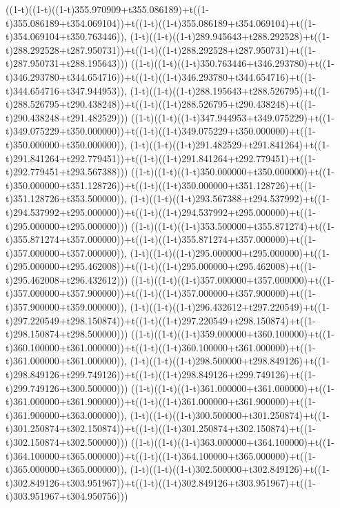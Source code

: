 ((1-t)((1-t)((1-t)355.970909+t355.086189)+t((1-t)355.086189+t354.069104))+t((1-t)((1-t)355.086189+t354.069104)+t((1-t)354.069104+t350.763446)),                                     (1-t)((1-t)((1-t)289.945643+t288.292528)+t((1-t)288.292528+t287.950731))+t((1-t)((1-t)288.292528+t287.950731)+t((1-t)287.950731+t288.195643)))
((1-t)((1-t)((1-t)350.763446+t346.293780)+t((1-t)346.293780+t344.654716))+t((1-t)((1-t)346.293780+t344.654716)+t((1-t)344.654716+t347.944953)),                                     (1-t)((1-t)((1-t)288.195643+t288.526795)+t((1-t)288.526795+t290.438248))+t((1-t)((1-t)288.526795+t290.438248)+t((1-t)290.438248+t291.482529)))
((1-t)((1-t)((1-t)347.944953+t349.075229)+t((1-t)349.075229+t350.000000))+t((1-t)((1-t)349.075229+t350.000000)+t((1-t)350.000000+t350.000000)),                                     (1-t)((1-t)((1-t)291.482529+t291.841264)+t((1-t)291.841264+t292.779451))+t((1-t)((1-t)291.841264+t292.779451)+t((1-t)292.779451+t293.567388)))
((1-t)((1-t)((1-t)350.000000+t350.000000)+t((1-t)350.000000+t351.128726))+t((1-t)((1-t)350.000000+t351.128726)+t((1-t)351.128726+t353.500000)),                                     (1-t)((1-t)((1-t)293.567388+t294.537992)+t((1-t)294.537992+t295.000000))+t((1-t)((1-t)294.537992+t295.000000)+t((1-t)295.000000+t295.000000)))
((1-t)((1-t)((1-t)353.500000+t355.871274)+t((1-t)355.871274+t357.000000))+t((1-t)((1-t)355.871274+t357.000000)+t((1-t)357.000000+t357.000000)),                                     (1-t)((1-t)((1-t)295.000000+t295.000000)+t((1-t)295.000000+t295.462008))+t((1-t)((1-t)295.000000+t295.462008)+t((1-t)295.462008+t296.432612)))
((1-t)((1-t)((1-t)357.000000+t357.000000)+t((1-t)357.000000+t357.900000))+t((1-t)((1-t)357.000000+t357.900000)+t((1-t)357.900000+t359.000000)),                                     (1-t)((1-t)((1-t)296.432612+t297.220549)+t((1-t)297.220549+t298.150874))+t((1-t)((1-t)297.220549+t298.150874)+t((1-t)298.150874+t298.500000)))
((1-t)((1-t)((1-t)359.000000+t360.100000)+t((1-t)360.100000+t361.000000))+t((1-t)((1-t)360.100000+t361.000000)+t((1-t)361.000000+t361.000000)),                                     (1-t)((1-t)((1-t)298.500000+t298.849126)+t((1-t)298.849126+t299.749126))+t((1-t)((1-t)298.849126+t299.749126)+t((1-t)299.749126+t300.500000)))
((1-t)((1-t)((1-t)361.000000+t361.000000)+t((1-t)361.000000+t361.900000))+t((1-t)((1-t)361.000000+t361.900000)+t((1-t)361.900000+t363.000000)),                                     (1-t)((1-t)((1-t)300.500000+t301.250874)+t((1-t)301.250874+t302.150874))+t((1-t)((1-t)301.250874+t302.150874)+t((1-t)302.150874+t302.500000)))
((1-t)((1-t)((1-t)363.000000+t364.100000)+t((1-t)364.100000+t365.000000))+t((1-t)((1-t)364.100000+t365.000000)+t((1-t)365.000000+t365.000000)),                                     (1-t)((1-t)((1-t)302.500000+t302.849126)+t((1-t)302.849126+t303.951967))+t((1-t)((1-t)302.849126+t303.951967)+t((1-t)303.951967+t304.950756)))
